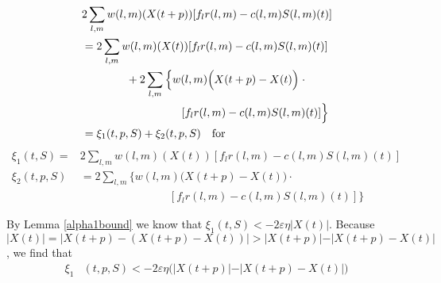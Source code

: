 \begin{IEEEproof}
\begin{small}
\begin{align} \nonumber 
&2\sum_{l,m} w(l,m)(X(t + p)) [f_{l}  r(l,m) -  c(l,m)S(l,m)(t) ]     \\ \nonumber
&=  2\sum_{l,m} w(l,m)(X(t )) [f_{l}r(l,m) - c(l,m)S(l,m)(t) ]  \\ \nonumber
& \qquad  \qquad + 2\sum_{l,m} \Big\{w(l,m) \Big( X(t + p) - X(t) \Big)\; \cdot  \\ 
& \qquad \qquad \qquad \qquad \quad [f_{l}r(l,m) - c(l,m)S(l,m)(t) ] \Big\} \\  
&=  \xi_{1} (t,p,S)+  \xi_{2} (t,p,S) \text{\quad for} \nonumber
\end{align}
\begin{align*} 
\xi_{1} (t,S) = &2\sum_{l,m} w(l,m)(X(t)) [f_{l}r(l,m) - c(l,m)S(l,m)(t) ]  \\
\xi_{2} (t,p,S) &= 2\sum_{l,m} \Big\{w(l,m) \Big( X(t + p) - X(t) \Big) \cdot  \\ 
& \qquad \qquad \qquad \qquad [f_{l}r(l,m) - c(l,m)S(l,m)(t) ] \Big\} 
\end{align*}
\end{small}By Lemma \ref{alpha1bound} we know that 
$
\xi_1(t,S) < -2\varepsilon \eta \vert X(t) \vert
$. Because $
\vert X(t) \vert = \vert X(t + p) - (X(t + p) - X(t)) \vert
>  \vert X(t + p) \vert - \vert  X(t + p) - X(t)   \vert$, 
we find that
\begin{align} \nonumber
\xi_1 &(t,p,S) < -2\varepsilon \eta \big( \vert X(t + p) \vert -  \vert  X(t + p) - X(t)   \vert \big)\\ \nonumber

\end{align}
\end{IEEEproof}

